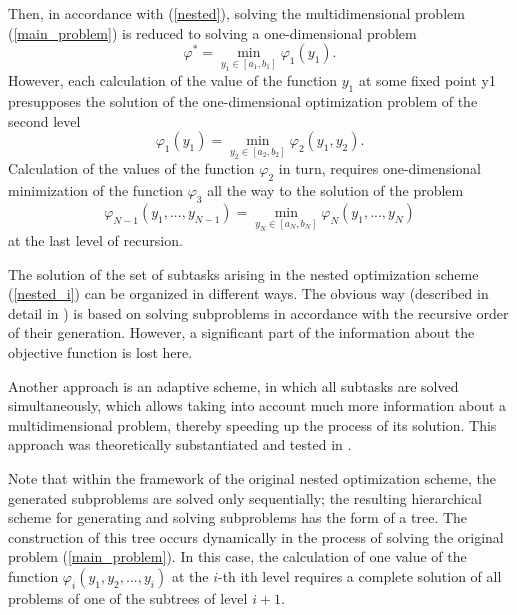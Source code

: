 \documentclass[entropy,article,submit,moreauthors,pdftex]{Definitions/mdpi}
\begin{document}
Then, in accordance with  (\ref{nested}), solving the multidimensional problem  (\ref{main_problem}) is reduced to solving a one-dimensional problem 
\begin{equation}\label{nested_1}
\varphi^* = \min_{y_1\in\left[a_1,b_1\right]}\varphi_1(y_1).
\end{equation}
However, each calculation of the value of the function $y_1$ at some fixed point y1 presupposes the solution of the one-dimensional optimization problem of the second level
\begin{equation}
\varphi_1(y_1) = \min_{y_2\in\left[a_2,b_2\right]}\varphi_2(y_1,y_2).
\end{equation}
Calculation of the values of the function  $\varphi_2$ in turn, requires one-dimensional minimization of the function  $\varphi_3$ all the way to the solution of the problem
\begin{equation}
\varphi_{N-1}(y_1,...,y_{N-1}) = \min_{ y_{N} \in\left[a_{N},b_{N}\right]} \varphi_{N}(y_1,...,y_{N})
\end{equation}
at the last level of recursion.

The solution of the set of subtasks arising in the nested optimization scheme  (\ref{nested_i}) can be organized in different ways. 
The obvious way (described in detail in \cite{Grishagin2001,Grishagin2015}) is based on solving subproblems in accordance with the recursive order of their generation. However, a significant part of the information about the objective function is lost here.

Another approach is an adaptive scheme, in which all subtasks are solved simultaneously, which allows taking into account much more information about a multidimensional problem, thereby speeding up the process of its solution. 
This approach was theoretically substantiated and tested in  \cite{Grishagin2016,Grishagin2016_1,Grishagin2018}. 

Note that within the framework of the original nested optimization scheme, the generated subproblems are solved only sequentially; the resulting hierarchical scheme for generating and solving subproblems has the form of a tree. The construction of this tree occurs dynamically in the process of solving the original problem (\ref{main_problem}). In this case, the calculation of one value of the function $\varphi_i(y_1,y_2,...,y_i)$ at the $i$-th ith level requires a complete solution of all problems of one of the subtrees of level  $i+1$.
\end{document}
